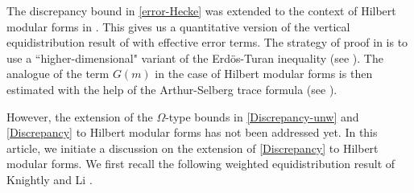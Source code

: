 \documentclass[reqno]{amsart}
\theoremstyle{plain}
\theoremstyle{definition}
\theoremstyle{remark}
\begin{document}
 The discrepancy bound in \eqref{error-Hecke} was extended to the context of Hilbert modular forms in \cite{LLW}.  This gives us a quantitative version of the vertical equidistribution result of \cite{Li-2009} with effective error terms.  The strategy of proof in \cite{LLW} is to use a ``higher-dimensional" variant of the Erd\"{o}s-Turan inequality (see \cite[Section 7]{Li-2009}).  The analogue of the term $G(m)$ in the case of Hilbert modular forms is then estimated with the help of the Arthur-Selberg  trace formula (see \cite[Section 3]{LLW}).
 
However, the extension of the $\Omega$-type bounds in \eqref{Discrepancy-unw} and \eqref{Discrepancy} to Hilbert modular forms has not been addressed yet.  In this article, we initiate a discussion on the extension of \eqref{Discrepancy} to Hilbert modular forms.  We first recall the following weighted equidistribution result of Knightly and Li \cite[Theorem 1.1]{KL}.
\end{document}
